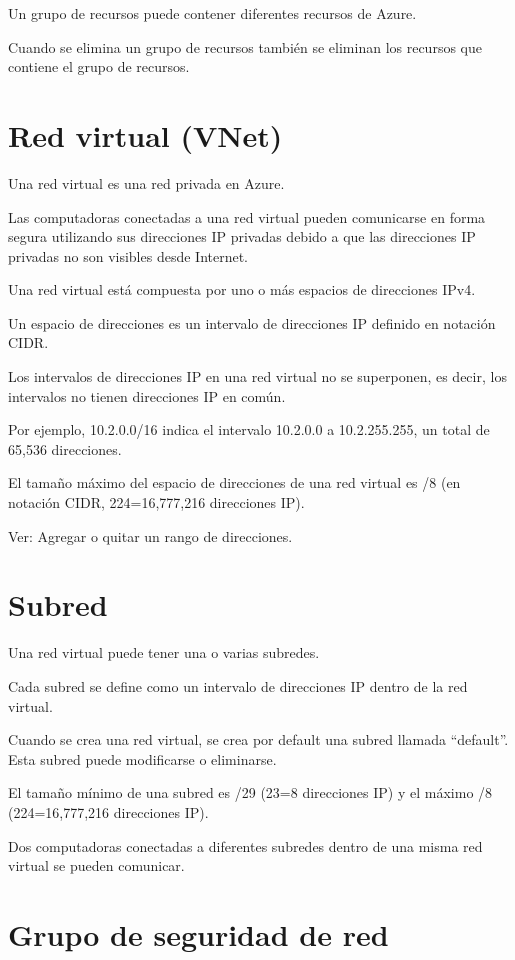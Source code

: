 Un grupo de recursos puede contener diferentes recursos de Azure.

Cuando se elimina un grupo de recursos también se eliminan los recursos que contiene el grupo de recursos.

\section{Red virtual (VNet)}

Una red virtual es una red privada en Azure.

Las computadoras conectadas a una red virtual pueden comunicarse en forma segura utilizando sus direcciones IP privadas debido a que las direcciones IP privadas no son visibles desde Internet.

Una red virtual está compuesta por uno o más espacios de direcciones IPv4.

Un espacio de direcciones es un intervalo de direcciones IP definido en notación CIDR.

Los intervalos de direcciones IP en una red virtual no se superponen, es decir, los intervalos no tienen direcciones IP en común.

Por ejemplo, 10.2.0.0/16 indica el intervalo 10.2.0.0 a 10.2.255.255, un total de 65,536 direcciones.

El tamaño máximo del espacio de direcciones de una red virtual es /8 (en notación CIDR, 224=16,777,216 direcciones IP).

Ver: Agregar o quitar un rango de direcciones.

\section{Subred}

Una red virtual puede tener una o varias subredes.

Cada subred se define como un intervalo de direcciones IP dentro de la red virtual.

Cuando se crea una red virtual, se crea por default una subred llamada “default”. Esta subred puede modificarse o eliminarse.

El tamaño mínimo de una subred es /29 (23=8 direcciones IP) y el máximo /8 (224=16,777,216 direcciones IP).

Dos computadoras conectadas a diferentes subredes dentro de una misma red virtual se pueden comunicar.

\section{Grupo de seguridad de red}

